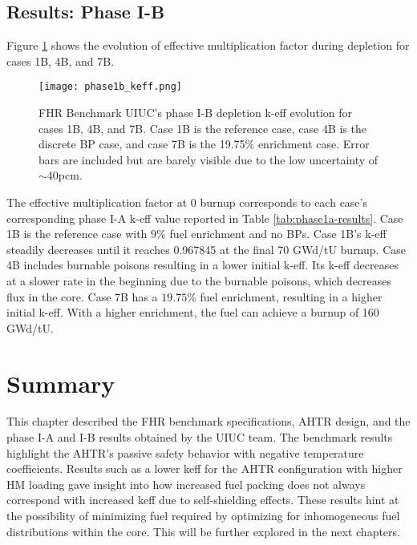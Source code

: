 \subsection{Results: Phase I-B}
Figure \ref{fig:phase1b_keff} shows the evolution of effective multiplication 
factor during depletion for cases 1B, 4B, and 7B.
\begin{figure}[]
    \centering
    \texttt{[image: phase1b\_keff.png]} 
    \caption{FHR Benchmark UIUC's phase I-B depletion k-eff evolution 
    for cases 1B, 4B, and 7B. Case 1B is the reference case, case 4B is the 
    discrete \gls{BP} case, and case 7B is the 19.75$\%$ enrichment case. 
    Error bars are included but are barely visible due to the low uncertainty 
    of $\sim$40pcm.}
    \label{fig:phase1b_keff}
\end{figure}
The effective multiplication factor at 0 burnup corresponds to each case's 
corresponding phase I-A k-eff value reported in Table \ref{tab:phase1a-results}. 
Case 1B is the reference case with $9\%$ fuel enrichment and no \glspl{BP}. 
Case 1B's k-eff steadily decreases until it reaches 0.967845 at the final 70 
GWd/tU burnup. 
Case 4B includes burnable poisons resulting in a lower initial k-eff. 
Its k-eff decreases at a slower rate in the beginning due to the burnable poisons, 
which decreases flux in the core. 
Case 7B has a $19.75\%$ fuel enrichment, resulting in a higher initial k-eff. 
With a higher enrichment, the fuel can achieve a burnup of 160 GWd/tU. 

\section{Summary}

This chapter described the \gls{FHR} benchmark specifications, \gls{AHTR} design,
and the phase I-A and I-B results obtained by the UIUC team. 
The benchmark results highlight the \gls{AHTR}'s passive safety behavior with 
negative temperature coefficients. 
Results such as a lower keff for the \gls{AHTR} configuration with 
higher \gls{HM} loading gave insight into how increased fuel packing does not always 
correspond with increased keff due to self-shielding effects.
These results hint at the possibility of minimizing fuel required by optimizing 
for inhomogeneous fuel distributions within the core. 
This will be further explored in the next chapters. 

